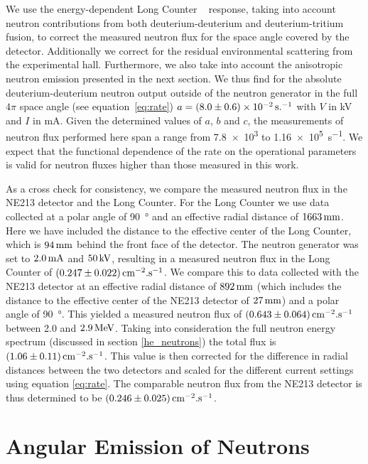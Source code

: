 We use the energy-dependent Long Counter ~\cite{npl_report} response, taking into account neutron contributions from both deuterium-deuterium and deuterium-tritium fusion, to correct the measured neutron flux for the space angle covered by the detector. Additionally we correct for the residual environmental scattering from the experimental hall. Furthermore, we also take into account the anisotropic neutron emission presented in the next section. We thus find for the absolute deuterium-deuterium neutron output outside of the neutron generator in the full $4\pi$ space angle (see equation~\ref{eq:rate}) $a = (8.0 \pm 0.6)\times10^{-2}\, \mathrm{s.^{-1}}$ with $V$ in kV and $I$ in mA. Given the determined values of $a$, $b$ and $c$, the measurements of neutron flux performed here span a range from \num{7.8e3} to \SI{1.16e5}{\second^{-1}}. We expect that the functional dependence of the rate on the operational parameters is valid for neutron fluxes higher than those measured in this work.

As a cross check for consistency, we compare the measured neutron flux in the NE213 detector and the Long Counter.  For the Long Counter we use data collected at a polar angle of \SI{90}{\degree} and an effective radial distance of $1663\, \mathrm{mm}$. Here we have included the distance to the effective center of the Long Counter, which is $94\, \mathrm{mm}$ behind the front face of the detector. The neutron generator was set to $2.0\, \mathrm{mA}$ and $50\, \mathrm{kV}$, resulting in a measured neutron flux in the Long Counter of $(0.247 \pm 0.022)\, \mathrm{cm^{-2}.s^{-1}}$. We compare this to data collected with the NE213 detector at an effective radial distance of $892\, \mathrm{mm}$ (which includes the distance to the effective center of the NE213 detector of $27\, \mathrm{mm}$) and a polar angle of \SI{90}{\degree}. This yielded a measured neutron flux of $(0.643 \pm 0.064)\, \mathrm{cm^{-2}.s^{-1}}$ between \num{2.0} and $2.9\, \mathrm{MeV}$. Taking into consideration the full neutron energy spectrum (discussed in section \ref{he_neutrons}) the total flux is $(1.06 \pm 0.11)\, \mathrm{cm^{-2}.s^{-1}}$. This value is then corrected for the difference in radial distances between the two detectors and scaled for the different current settings using equation \ref{eq:rate}. The comparable neutron flux from the NE213 detector is thus determined to be $(0.246 \pm 0.025)\, \mathrm{cm^{-2}.s^{-1}}$.

\section{Angular Emission of Neutrons}\label{sec:angular}

